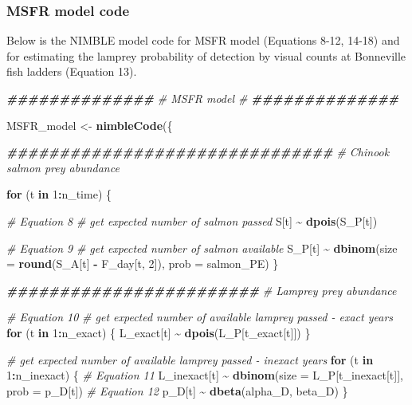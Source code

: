 \documentclass[
]{article}
\newenvironment{Shaded}{\begin{snugshade}}{\end{snugshade}}
\newcommand{\AttributeTok}[1]{\textcolor[rgb]{0.13,0.29,0.53}{#1}}
\newcommand{\CommentTok}[1]{\textcolor[rgb]{0.56,0.35,0.01}{\textit{#1}}}
\newcommand{\ControlFlowTok}[1]{\textcolor[rgb]{0.13,0.29,0.53}{\textbf{#1}}}
\newcommand{\DecValTok}[1]{\textcolor[rgb]{0.00,0.00,0.81}{#1}}
\newcommand{\DocumentationTok}[1]{\textcolor[rgb]{0.56,0.35,0.01}{\textbf{\textit{#1}}}}
\newcommand{\FunctionTok}[1]{\textcolor[rgb]{0.13,0.29,0.53}{\textbf{#1}}}
\newcommand{\NormalTok}[1]{#1}
\newcommand{\OtherTok}[1]{\textcolor[rgb]{0.56,0.35,0.01}{#1}}
\newcommand{\SpecialCharTok}[1]{\textcolor[rgb]{0.81,0.36,0.00}{\textbf{#1}}}
\begin{document}
\subsubsection{MSFR model code}\label{msfr-model-code}

Below is the NIMBLE model code for MSFR model (Equations 8-12, 14-18)
and for estimating the lamprey probability of detection by visual counts
at Bonneville fish ladders (Equation 13).

\begin{Shaded}
\begin{Highlighting}[]
\DocumentationTok{\#\#\#\#\#\#\#\#\#\#\#\#\#\#}
\CommentTok{\# MSFR model \#}
\DocumentationTok{\#\#\#\#\#\#\#\#\#\#\#\#\#\#}

\NormalTok{MSFR\_model }\OtherTok{\textless{}{-}} \FunctionTok{nimbleCode}\NormalTok{(\{}
  
  \DocumentationTok{\#\#\#\#\#\#\#\#\#\#\#\#\#\#\#\#\#\#\#\#\#\#\#\#\#\#\#\#\#\#\#}
  \CommentTok{\# Chinook salmon prey abundance}
  
  \ControlFlowTok{for}\NormalTok{ (t }\ControlFlowTok{in} \DecValTok{1}\SpecialCharTok{:}\NormalTok{n\_time) \{}
    
    \CommentTok{\# Equation 8}
    \CommentTok{\# get expected number of salmon passed}
\NormalTok{    S[t] }\SpecialCharTok{\textasciitilde{}} \FunctionTok{dpois}\NormalTok{(S\_P[t])}
    
    \CommentTok{\# Equation 9}
    \CommentTok{\# get expected number of salmon available}
\NormalTok{    S\_P[t] }\SpecialCharTok{\textasciitilde{}} \FunctionTok{dbinom}\NormalTok{(}\AttributeTok{size =} \FunctionTok{round}\NormalTok{(S\_A[t] }\SpecialCharTok{{-}}\NormalTok{ F\_day[t, }\DecValTok{2}\NormalTok{]), }
                    \AttributeTok{prob =}\NormalTok{ salmon\_PE)}
\NormalTok{  \}}
  
  \DocumentationTok{\#\#\#\#\#\#\#\#\#\#\#\#\#\#\#\#\#\#\#\#\#\#\#\#}
  \CommentTok{\# Lamprey prey abundance}
  
  \CommentTok{\# Equation 10}
  \CommentTok{\# get expected number of available lamprey passed {-} exact years}
  \ControlFlowTok{for}\NormalTok{ (t }\ControlFlowTok{in} \DecValTok{1}\SpecialCharTok{:}\NormalTok{n\_exact) \{}
\NormalTok{    L\_exact[t] }\SpecialCharTok{\textasciitilde{}} \FunctionTok{dpois}\NormalTok{(L\_P[t\_exact[t]])}
\NormalTok{  \}}
  
  \CommentTok{\# get expected number of available lamprey passed {-} inexact years}
  \ControlFlowTok{for}\NormalTok{ (t }\ControlFlowTok{in} \DecValTok{1}\SpecialCharTok{:}\NormalTok{n\_inexact) \{}
    \CommentTok{\# Equation 11}
\NormalTok{    L\_inexact[t] }\SpecialCharTok{\textasciitilde{}} \FunctionTok{dbinom}\NormalTok{(}\AttributeTok{size =}\NormalTok{ L\_P[t\_inexact[t]], }
                          \AttributeTok{prob =}\NormalTok{ p\_D[t])}
    \CommentTok{\# Equation 12}
\NormalTok{    p\_D[t] }\SpecialCharTok{\textasciitilde{}} \FunctionTok{dbeta}\NormalTok{(alpha\_D, beta\_D)}
\NormalTok{  \}}
  

\end{Highlighting}
\end{Shaded}
\end{document}
